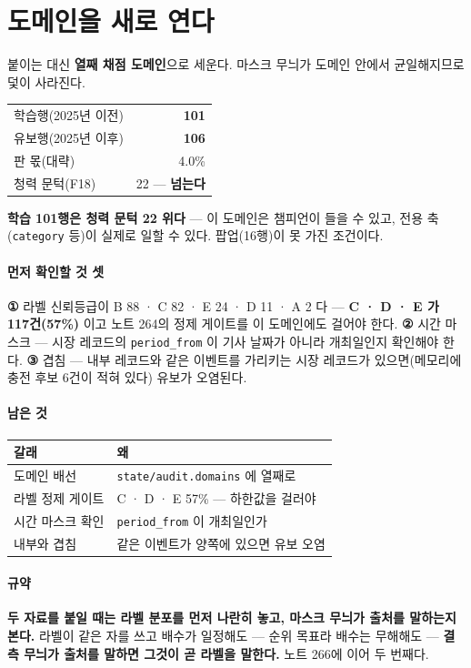 \documentclass[10pt]{article}
\begin{document}
\section{도메인을 새로 연다}

붙이는 대신 \textbf{열째 채점 도메인}으로 세운다. 마스크 무늬가 도메인
안에서 균일해지므로 덫이 사라진다.

\begin{center}\small
\begin{tabular}{lr}
\hline
학습행(2025년 이전) & \textbf{101} \\
유보행(2025년 이후) & \textbf{106} \\
판 몫(대략) & 4.0\% \\
\hline
청력 문턱(F18) & 22 --- \textbf{넘는다} \\
\hline
\end{tabular}
\end{center}

\textbf{학습 101행은 청력 문턱 22 위다} --- 이 도메인은 챔피언이 들을 수
있고, 전용 축(\texttt{category} 등)이 실제로 일할 수 있다. 팝업(16행)이 못
가진 조건이다.

\paragraph{먼저 확인할 것 셋} \textbf{①} 라벨 신뢰등급이 B 88 · C 82 ·
E 24 · D 11 · A 2 다 --- \textbf{C · D · E 가 117건(57\%)} 이고 노트 264의
정제 게이트를 이 도메인에도 걸어야 한다. \textbf{②} 시간 마스크 --- 시장
레코드의 \texttt{period\_from} 이 기사 날짜가 아니라 개최일인지 확인해야
한다. \textbf{③} 겹침 --- 내부 레코드와 같은 이벤트를 가리키는 시장 레코드가
있으면(메모리에 충전 후보 6건이 적혀 있다) 유보가 오염된다.

\paragraph{남은 것}
\begin{center}\small
\begin{tabular}{ll}
\hline
갈래 & 왜 \\
\hline
도메인 배선 & \texttt{state/audit.domains} 에 열째로 \\
라벨 정제 게이트 & C · D · E 57\% --- 하한값을 걸러야 \\
시간 마스크 확인 & \texttt{period\_from} 이 개최일인가 \\
내부와 겹침 & 같은 이벤트가 양쪽에 있으면 유보 오염 \\
\hline
\end{tabular}
\end{center}

\paragraph{규약} \textbf{두 자료를 붙일 때는 라벨 분포를 먼저 나란히 놓고,
마스크 무늬가 출처를 말하는지 본다.} 라벨이 같은 자를 쓰고 배수가 일정해도
--- 순위 목표라 배수는 무해해도 --- \textbf{결측 무늬가 출처를 말하면 그것이
곧 라벨을 말한다.} 노트 266에 이어 두 번째다.
\end{document}

